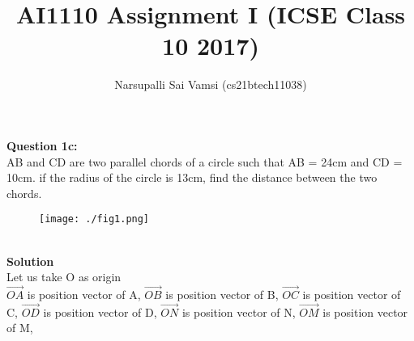 \documentclass{beamer}
\title{AI1110 Assignment I (ICSE Class 10 2017)}
\author{Narsupalli Sai Vamsi (cs21btech11038)}
\begin{document}
\maketitle
\textbf{Question 1c:} \\
AB and CD are two parallel chords of a circle such that 
AB = 24cm and CD = 10cm. if the radius of the circle is 13cm,
find the distance between the two chords.
\begin{figure}
    \centering
    \texttt{[image: ./fig1.png]}
    \caption{}
    \label{fig:1}
\end{figure} \\
\textbf{Solution} \\
Let us take O as origin \\
$\vec{OA}$ is position vector of A, $\vec{OB}$ is position vector of B,
$\vec{OC}$ is position vector of C, $\vec{OD}$ is position vector of D,
$\vec{ON}$ is position vector of N, $\vec{OM}$ is position vector of M,\\
\end{document}
